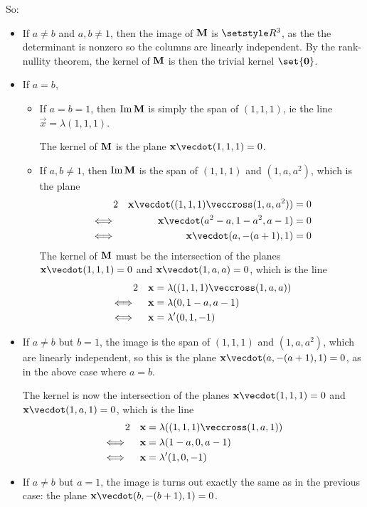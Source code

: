 \documentclass[fleqn,a4paper,11pt]{article}
\begin{document}
\begin{enumerate}[label=\textbf{\arabic*.}]
   So:
   \begin{itemize}
    \item
     If \(a \ne b\) and \(a, b \ne 1\), then the image of \(\mathbf{M}\) is
     \(\Reals^3\), as the the determinant is nonzero so the columns are linearly
     independent. By the rank-nullity theorem, the kernel of \(\mathbf{M}\) is then
     the trivial kernel \(\set{\vec 0}\).
    \item
     If \(a = b\),
     \begin{itemize}
      \item
       If \(a = b = 1\), then \(\operatorname{Im} \mathbf{M}\) is simply the span of
       \((1, 1, 1)\), ie the line \(\vec x = \lambda(1, 1, 1)\).

       The kernel of \(\mathbf{M}\) is the plane \(\vec x \vecdot (1, 1, 1) = 0\).
      \item
       If \(a, b \ne 1\), then \(\operatorname{Im} \mathbf{M}\) is the span of
       \((1, 1, 1)\) and \((1, a, a^2)\), which is the plane
       \begin{alignat*}2
        && \vec x \vecdot ((1, 1, 1) \veccross (1, a, a^2)) &= 0 \\
        \iff{}&& \vec x \vecdot (a^2 - a, 1 - a^2, a - 1) &= 0 \\
        \iff{}&& \vec x \vecdot (a, -(a + 1), 1) &= 0
       \end{alignat*}
       The kernel of \(\mathbf{M}\) must be the intersection of the planes
       \(\vec x \vecdot (1, 1, 1) = 0\) and \(\vec x \vecdot(1, a, a) = 0\),
       which is the line
       \begin{alignat*}2
        && \vec x &= \lambda ((1, 1, 1) \veccross (1, a, a)) \\
        \iff{}&& \vec x &= \lambda (0, 1 - a, a - 1) \\
        \iff{}&& \vec x &= \lambda' (0, 1, -1)
       \end{alignat*}
     \end{itemize}
    \item
     If \(a \ne b\) but \(b = 1\), the image is the span of
     \((1, 1, 1)\) and \((1, a, a^2)\), which are linearly independent, so this
     is the plane \(\vec x \vecdot (a, -(a + 1), 1) = 0\), as in the above case
     where \(a = b\).

     The kernel is now the intersection of the planes
     \(\vec x \vecdot (1, 1, 1) = 0\) and \(\vec x \vecdot (1, a, 1) = 0\),
     which is the line
     \begin{alignat*}2
      &&\vec x &= \lambda((1, 1, 1) \veccross (1, a, 1)) \\
      \iff{}&&\vec x &= \lambda(1 - a, 0, a - 1) \\
      \iff{}&&\vec x &= \lambda'(1, 0, -1)
     \end{alignat*}
    \item
      If \(a \ne b\) but \(a = 1\), the image is turns out exactly the same as
      in the previous case: the plane
      \(\vec x \vecdot (b, -(b + 1), 1) = 0\).


\end{itemize}
\end{enumerate}
\end{document}
